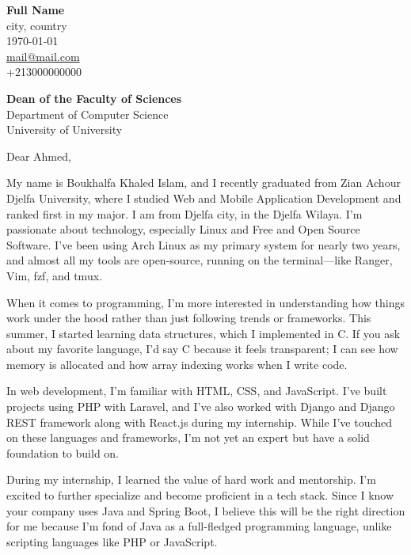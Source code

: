 \documentclass[a4paper,12pt]{article}
\begin{document}
\begin{titlepage}

    \begin{minipage}[t]{0.95\textwidth}
        \hfill
        \raggedleft
        \textbf{Full Name } \\
        city, country \\
        \today\\
        \href{mailto:mail@mail.com}{mail@mail.com} \\
        +213000000000 \\
    \end{minipage}

\raggedright \textbf{Dean of the Faculty of Sciences} \\ Department of Computer Science \\  University of University \\  

\vspace{0.7em}

\raggedright Dear Ahmed,\\

\vspace{0.7em}

My name is Boukhalfa Khaled Islam, and I recently graduated from Zian Achour Djelfa University, where I studied Web and Mobile Application Development and ranked first in my major. I am from Djelfa city, in the Djelfa Wilaya. I'm passionate about technology, especially Linux and Free and Open Source Software. I've been using Arch Linux as my primary system for nearly two years, and almost all my tools are open-source, running on the terminal—like Ranger, Vim, fzf, and tmux.

When it comes to programming, I’m more interested in understanding how things work under the hood rather than just following trends or frameworks. This summer, I started learning data structures, which I implemented in C. If you ask about my favorite language, I’d say C because it feels transparent; I can see how memory is allocated and how array indexing works when I write code.

In web development, I’m familiar with HTML, CSS, and JavaScript. I’ve built projects using PHP with Laravel, and I’ve also worked with Django and Django REST framework along with React.js during my internship. While I’ve touched on these languages and frameworks, I’m not yet an expert but have a solid foundation to build on.

During my internship, I learned the value of hard work and mentorship. I’m excited to further specialize and become proficient in a tech stack. Since I know your company uses Java and Spring Boot, I believe this will be the right direction for me because I’m fond of Java as a full-fledged programming language, unlike scripting languages like PHP or JavaScript.


\end{titlepage}
\end{document}

